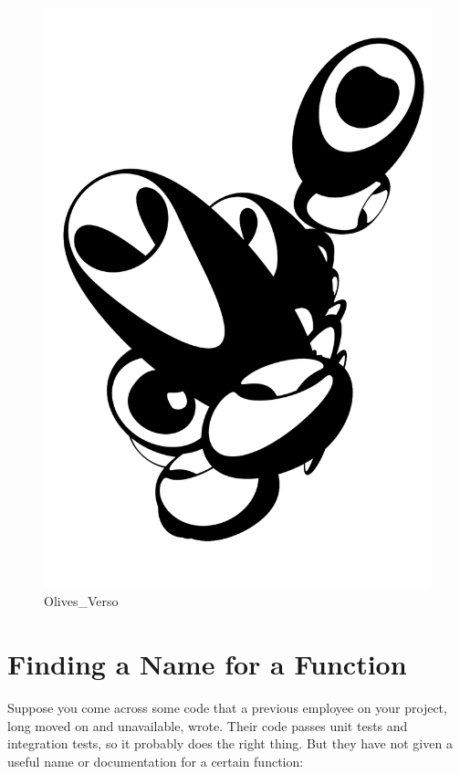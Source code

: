 \begin{figure}
\centering
\includegraphics{images/Olives_Verso.png}
\caption{Olives\_Verso}
\end{figure}

\newpage

\hypertarget{finding-a-name-for-a-function}{%
\section{Finding a Name for a
Function}\label{finding-a-name-for-a-function}}

Suppose you come across some code that a previous employee on your
project, long moved on and unavailable, wrote. Their code passes unit
tests and integration tests, so it probably does the right thing. But
they have not given a useful name or documentation for a certain
function:


